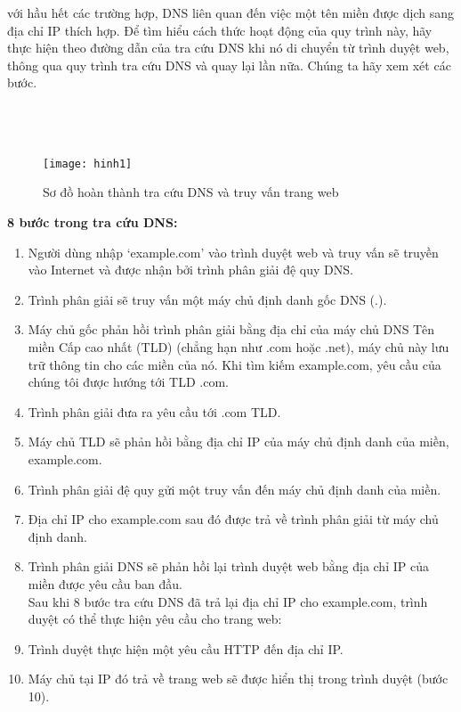 \documentclass{article}
\begin{document}
 với hầu hết các trường hợp, DNS liên quan đến việc một tên miền được dịch sang địa chỉ IP thích hợp. Để tìm hiểu cách thức hoạt động của quy trình này, hãy thực hiện theo đường dẫn của tra cứu DNS khi nó di chuyển từ trình duyệt web, thông qua quy trình tra cứu DNS và quay lại lần nữa. Chúng ta hãy xem xét các bước.\\
\\
\\
\\
\begin{figure}[ht]

\begin{center}

\texttt{[image: hinh1]}\\

\end{center}

\caption{Sơ đồ hoàn thành tra cứu DNS và truy vấn trang web}

\end{figure}
\textbf{8 bước trong tra cứu DNS:} \\
\begin{enumerate}
    \item Người dùng nhập ‘example.com’ vào trình duyệt web và truy vấn sẽ truyền vào Internet và được nhận bởi trình phân giải đệ quy DNS.
    \item Trình phân giải sẽ truy vấn một máy chủ định danh gốc DNS (.).
    \item Máy chủ gốc phản hồi trình phân giải bằng địa chỉ của máy chủ DNS Tên miền Cấp cao nhất (TLD) (chẳng hạn như .com hoặc .net), máy chủ này lưu trữ thông tin cho các miền của nó. Khi tìm kiếm example.com, yêu cầu của chúng tôi được hướng tới TLD .com.
    \item Trình phân giải đưa ra yêu cầu tới .com TLD.
    \item Máy chủ TLD sẽ phản hồi bằng địa chỉ IP của máy chủ định danh của miền, example.com.
    \item Trình phân giải đệ quy gửi một truy vấn đến máy chủ định danh của miền.
    \item Địa chỉ IP cho example.com sau đó được trả về trình phân giải từ máy chủ định danh.
    \item Trình phân giải DNS sẽ phản hồi lại trình duyệt web bằng địa chỉ IP của miền được yêu cầu ban đầu.\\
    
    Sau khi 8 bước tra cứu DNS đã trả lại địa chỉ IP cho example.com, trình duyệt có thể thực hiện yêu cầu cho trang web:
    \item Trình duyệt thực hiện một yêu cầu HTTP đến địa chỉ IP.
    \item Máy chủ tại IP đó trả về trang web sẽ được hiển thị trong trình duyệt (bước 10).
\end{enumerate}
\end{document}
